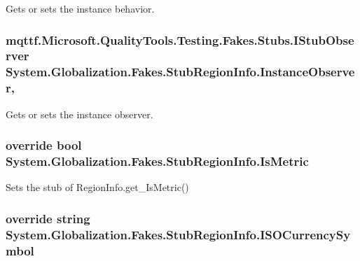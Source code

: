 Gets or sets the instance behavior.

\hypertarget{class_system_1_1_globalization_1_1_fakes_1_1_stub_region_info_a2de69838e02d212646362fe1b03663d6}{
\subsubsection[{Instance\-Observer}]{\setlength{\rightskip}{0pt plus 5cm}mqttf.\-Microsoft.\-Quality\-Tools.\-Testing.\-Fakes.\-Stubs.\-I\-Stub\-Observer System.\-Globalization.\-Fakes.\-Stub\-Region\-Info.\-Instance\-Observer\hspace{0.3cm}{\ttfamily [get]}, {\ttfamily [set]}}}\label{class_system_1_1_globalization_1_1_fakes_1_1_stub_region_info_a2de69838e02d212646362fe1b03663d6}


Gets or sets the instance observer.

\hypertarget{class_system_1_1_globalization_1_1_fakes_1_1_stub_region_info_a1393e8bfdd98e11061e58dfd6edfd36c}{
\subsubsection[{Is\-Metric}]{\setlength{\rightskip}{0pt plus 5cm}override bool System.\-Globalization.\-Fakes.\-Stub\-Region\-Info.\-Is\-Metric\hspace{0.3cm}{\ttfamily [get]}}}\label{class_system_1_1_globalization_1_1_fakes_1_1_stub_region_info_a1393e8bfdd98e11061e58dfd6edfd36c}


Sets the stub of Region\-Info.\-get\-\_\-\-Is\-Metric()

\hypertarget{class_system_1_1_globalization_1_1_fakes_1_1_stub_region_info_a89a7070ddd00c600c4d0515ce6415317}{
\subsubsection[{I\-S\-O\-Currency\-Symbol}]{\setlength{\rightskip}{0pt plus 5cm}override string System.\-Globalization.\-Fakes.\-Stub\-Region\-Info.\-I\-S\-O\-Currency\-Symbol\hspace{0.3cm}{\ttfamily [get]}}}\label{class_system_1_1_globalization_1_1_fakes_1_1_stub_region_info_a89a7070ddd00c600c4d0515ce6415317}


